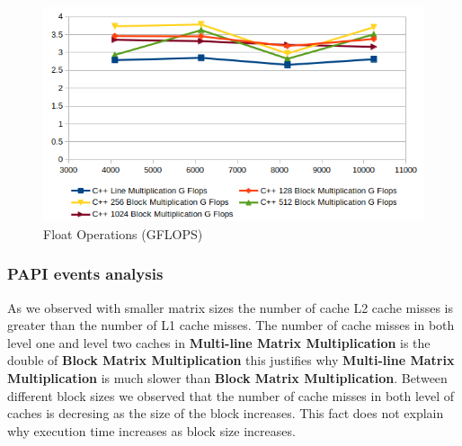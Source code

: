 \begin{figure}[H]
    \centering
    \includegraphics[width=.8\linewidth]{img/big_flops.png}
    \caption{Float Operations (\uppercase{GFLOPS})}
\end{figure}

\subsubsection{PAPI events analysis}

As we observed with smaller matrix sizes the number of cache L2 cache misses is greater than the number of L1 cache misses. The number of cache misses in both level one and level two caches in \textbf{Multi-line Matrix Multiplication} is the double of \textbf{Block Matrix Multiplication} this justifies why \textbf{Multi-line Matrix Multiplication} is much slower than \textbf{Block Matrix Multiplication}. Between different block sizes we observed that the number of cache misses in both level of caches is decresing as the size of the block increases. This fact does not explain why execution time increases as block size increases.

